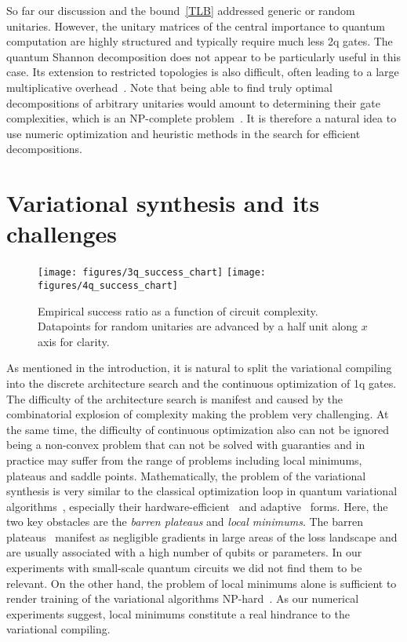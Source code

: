 \documentclass[twocolumn, amsfonts, amssymb, aps, nofootinbib]{revtex4-2}
\begin{document}
So far our discussion and the bound~\eqref{TLB} addressed generic or random unitaries. However, the unitary matrices of the central importance to quantum computation are highly structured and typically require much less 2q gates. The quantum Shannon decomposition does not appear to be particularly useful in this case. Its extension to restricted topologies is also difficult, often leading to a large multiplicative overhead~\cite{Shende2006}. Note that being able to find truly optimal decompositions of arbitrary unitaries would amount to determining their gate complexities, which is an NP-complete problem~\cite{Botea2018}. It is therefore a natural idea to use numeric optimization and heuristic methods in the search for efficient decompositions.

\section{Variational synthesis and its challenges \label{sec local minimums}}

\begin{figure*}
	\texttt{[image: figures/3q\_success\_chart]}
	\texttt{[image: figures/4q\_success\_chart]}
	\caption{Empirical success ratio as a function of circuit complexity. Datapoints for random unitaries are advanced by a half unit along $x$ axis for clarity.}
	\label{fig local minimums}
\end{figure*}


As mentioned in the introduction, it is natural to split the variational compiling into the discrete architecture search and the continuous optimization of 1q gates. The difficulty of the architecture search is manifest and caused by the combinatorial explosion of complexity making the problem very challenging. At the same time, the difficulty of continuous optimization also can not be ignored being a non-convex problem that can not be solved with guaranties and in practice may suffer from the range of problems including local minimums, plateaus and saddle points. Mathematically, the problem of the variational synthesis is very similar to the classical optimization loop in quantum variational algorithms~\cite{McClean2016}, especially their hardware-efficient~\cite{Kandala2017} and adaptive~\cite{Tang2021} forms. Here, the two key obstacles are the \textit{barren plateaus} and \textit{local minimums}. The barren plateaus~\cite{McClean2018} manifest as negligible gradients in large areas of the loss landscape and are usually associated with a high number of qubits or parameters. In our experiments with small-scale quantum circuits we did not find them to be relevant. On the other hand, the problem of local minimums alone is sufficient to render training of the variational algorithms NP-hard~\cite{Bittel2021}. As our numerical experiments suggest, local minimums constitute a real hindrance to the variational compiling.
\end{document}
